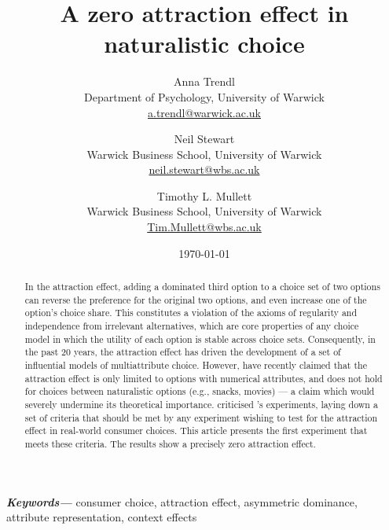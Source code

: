 \documentclass[12pt, a4paper]{article}
\title{}
\author{}
\date{}
\providecommand{\keywords}[1]{\textbf{\textit{Keywords---}} #1}
\begin{document}
\title{A zero attraction effect in naturalistic choice}

\author{Anna Trendl\\Department of Psychology, University of Warwick  \\  \href{mailto:a.trendl@warwick.ac.uk}{a.trendl@warwick.ac.uk} 
\and Neil Stewart \\Warwick Business School, University of Warwick \\  \href{mailto:neil.stewart@wbs.ac.uk}{neil.stewart@wbs.ac.uk} 
\and Timothy L. Mullett\\Warwick Business School, University of Warwick\\  \href{mailto:Tim.Mullett@wbs.ac.uk}{Tim.Mullett@wbs.ac.uk} } 

\date{\today}


\begin{titlepage}
\maketitle

\newpage

\begin{abstract}
In the attraction effect, adding a dominated third option to a choice set of two options can reverse the preference for the original two options, and even increase one of the option's choice share. This constitutes a violation of the axioms of regularity and independence from irrelevant alternatives, which are core properties of any choice model in which the utility of each option is stable across choice sets. Consequently, in the past 20 years, the attraction effect has driven the development of a set of influential models of multiattribute choice. However,  have recently claimed that the attraction effect is only limited to options with numerical attributes, and does not hold for choices between naturalistic options (e.g., snacks, movies) --- a claim which would severely undermine its theoretical importance.  criticised \citeauthor{Frederick2014}'s experiments, laying down a set of criteria that should be met by any experiment wishing to test for the attraction effect in real-world consumer choices. This article presents the first experiment that meets these criteria. The results show a precisely zero attraction effect.
\end{abstract}
\keywords{consumer choice, attraction effect, asymmetric dominance, attribute representation,  context effects}


\end{titlepage}
\end{document}
